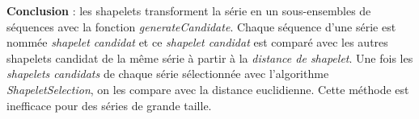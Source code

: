 {\bf Conclusion} : les shapelets transforment la s\'erie en un sous-ensembles de s\'equences avec la fonction {\em generateCandidate}. Chaque s\'equence d'une s\'erie est nomm\'ee {\em shapelet candidat} et ce {\em shapelet candidat} est compar\'e avec  les autres shapelets candidat de la m\^eme s\'erie \`a partir \`a la {\em distance de shapelet}. Une fois les {\em shapelets candidats} de chaque s\'erie s\'electionn\'ee avec l'algorithme {\em ShapeletSelection}, on les compare avec la distance euclidienne.
Cette m\'ethode est inefficace pour des s\'eries de grande taille.
%
%
%
%
